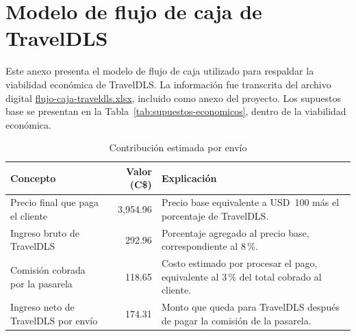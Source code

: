 \clearpage
\appendix
{}
{}

\section{Modelo de flujo de caja de TravelDLS}
\label{anexo:flujo-caja}

Este anexo presenta el modelo de flujo de caja utilizado para respaldar la viabilidad económica de TravelDLS. La información fue transcrita del archivo digital \href{run:anexos/flujo-caja-traveldls.xlsx}{flujo-caja-traveldls.xlsx}, incluido como anexo del proyecto. Los supuestos base se presentan en la Tabla~\ref{tab:supuestos-economicos}, dentro de la viabilidad económica.

\begin{table}[H]
	\centering
	\caption{Contribución estimada por envío}
	\label{tab:anexo-contribucion-envio}
	\begin{tabularx}{\textwidth}{>{\RaggedRight\arraybackslash}X r >{\RaggedRight\arraybackslash}X}
		\toprule
		Concepto & Valor (C\$) & Explicación \\
		\midrule
		Precio final que paga el cliente & 3,954.96 & Precio base equivalente a USD~100 más el porcentaje de TravelDLS. \\
		Ingreso bruto de TravelDLS & 292.96 & Porcentaje agregado al precio base, correspondiente al 8\,\%. \\
		Comisión cobrada por la pasarela & 118.65 & Costo estimado por procesar el pago, equivalente al 3\,\% del total cobrado al cliente. \\
		Ingreso neto de TravelDLS por envío & 174.31 & Monto que queda para TravelDLS después de pagar la comisión de la pasarela. \\
		\bottomrule
	\end{tabularx}
\end{table}

\begin{table}[H]
	\centering
	\caption{Flujo de caja proyectado}
	\label{tab:anexo-flujo-caja-proyectado}
	{\small
		\setlength{\tabcolsep}{4pt}
	}
\end{table}

